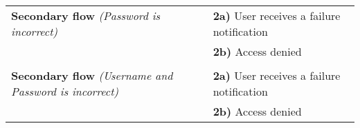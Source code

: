 \documentclass[a4paper,11pt]{article}
\begin{document}
\begin{tabular}{|p{3.5cm}|p{11.5cm}|}
    \textbf{Secondary flow} \emph{(Password is incorrect)} &  
    \textbf{2a)} User receives a failure notification \\ &
    \textbf{2b)} Access denied
    
    \\ \hline \rowcolor{Gray} & \\ \hline  
    
    \textbf{Secondary flow} \emph{(Username and Password is incorrect)} &  
    \textbf{2a)} User receives a failure notification \\ &
    \textbf{2b)} Access denied
    
    \\ \hline   
\end{tabular} 
\end{document}
